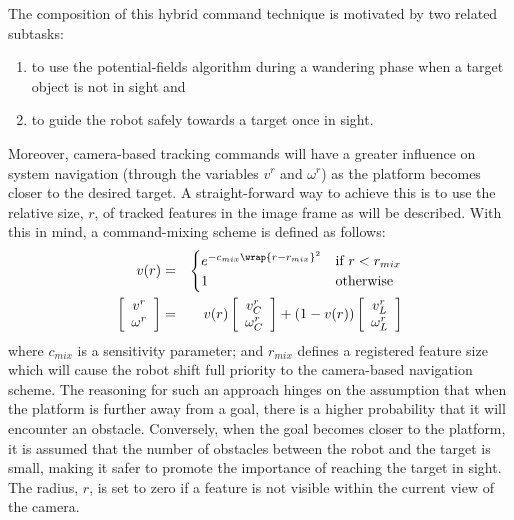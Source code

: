 			The composition of this hybrid command technique is motivated by two related subtasks: 
				\begin{enumerate}
				\item to use the potential-fields algorithm during a wandering phase when a target object is not in sight and
				\item to guide the robot safely towards a target once in sight.
				\end{enumerate}
			Moreover, camera-based tracking commands will have a greater influence on system navigation (through the variables $v^{r}$ and $\omega^{r}$) as the platform becomes closer to the desired target. A straight-forward way to achieve this is to use the relative size, $r$, of tracked features in the image frame as will be described. With this in mind, a command-mixing scheme is defined as follows:
			\begin{eqnarray}
				v(r) &=&
				\begin{cases}
				e^{ -c_{mix} \wrap{ r - r_{mix}}^{2} } 	& \text{if } r < r_{mix}	\\
				1											& \text{otherwise}
				\end{cases}
								\nonumber \\
						\left[\begin{array}{c} v^{r} 	\\ \omega^{r} 		\end{array} \right] &=& 	
				v(r)	\left[\begin{array}{c} v^{r}_{C}\\ \omega^{r}_{C} 	\end{array} \right] + 
				(1-v(r))\left[\begin{array}{c} v^{r}_{L}\\ \omega^{r}_{L} 	\end{array} \right] 
			\end{eqnarray}
			where $c_{mix}$ is a sensitivity parameter; and $r_{mix}$ defines a registered feature size which will cause the robot shift full priority to the camera-based navigation scheme. The reasoning for such an approach hinges on the assumption that when the platform is further away from a goal, there is a higher probability that it will encounter an obstacle. Conversely, when the goal becomes closer to the platform, it is assumed that the number of obstacles between the robot and the target is small, making it safer to promote the importance of reaching the target in sight. The radius, $r$, is set to zero if a feature is not visible within the current view of the camera.

